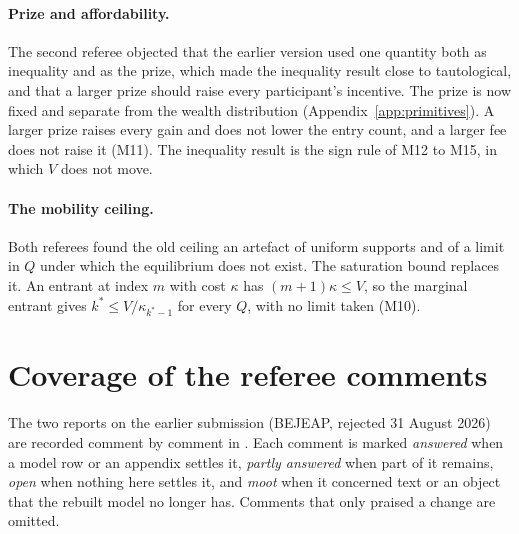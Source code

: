 \paragraph{Prize and affordability.} The second referee objected that the
earlier version used one quantity both as inequality and as the prize, which
made the inequality result close to tautological, and that a larger prize
should raise every participant's incentive. The prize is now fixed and
separate from the wealth distribution (Appendix~\ref{app:primitives}). A larger
prize raises every gain and does not lower the entry count, and a larger fee
does not raise it (M11).
The inequality result is the sign rule of M12 to M15, in which $V$ does not
move.

\paragraph{The mobility ceiling.} Both referees found the old ceiling an
artefact of uniform supports and of a limit in $Q$ under which the
equilibrium does not exist. The saturation bound replaces it. An entrant at
index $m$ with cost $\kappa$ has $(m+1)\kappa\le V$, so the marginal entrant
gives $k^*\le V/\kappa_{k^*-1}$ for every $Q$, with no limit taken (M10).

\section{Coverage of the referee comments}
\label{app:coverage}

The two reports on the earlier submission (BEJEAP, rejected 31 August 2026)
are recorded comment by comment in .
Each comment is marked \emph{answered} when a model row or an appendix settles
it, \emph{partly answered} when part of it remains, \emph{open} when nothing
here settles it, and \emph{moot} when it concerned text or an object that the
rebuilt model no longer has. Comments that only praised a change are omitted.

